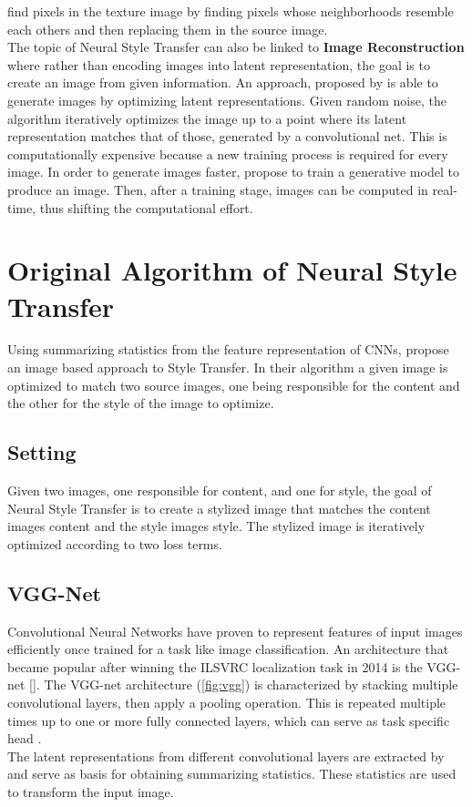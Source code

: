 \documentclass{seminar}
\begin{document}
\cite{efros1999texture} find pixels in the texture image by finding pixels whose neighborhoods resemble each others and then replacing them in the source image.\\
The topic of Neural Style Transfer can also be linked to \textbf{Image Reconstruction} where rather than encoding images into latent representation, the goal is to create an image from given information. An approach, proposed by \cite{mahendran2015understanding} is able to generate images by optimizing latent representations. Given random noise, the algorithm iteratively optimizes the image up to a point where its latent representation matches that of those, generated by a convolutional net.
This is computationally expensive because a new training process is required for every image. In order to generate images faster, \cite{dosovitskiy2016generating} propose to train a generative model to produce an image. Then, after a training stage, images can be computed in real-time, thus shifting the computational effort.




\section{Original Algorithm of Neural Style Transfer}
Using summarizing statistics from the feature representation of CNNs, \cite{gatys2015neural} propose an image based approach to Style Transfer. In their algorithm a given image is optimized to match two source images, one being responsible for the content and the other for the style of the image to optimize.
\subsection{Setting}
Given two images, one responsible for content, and one for style, the goal of Neural Style Transfer is to create a stylized image that matches the content images content and the style images style. The stylized image is iteratively optimized according to two loss terms.

\subsection{VGG-Net}
Convolutional Neural Networks have proven to represent features of input images efficiently once trained for a task like image classification. An architecture that became popular after winning the ILSVRC localization task in 2014 is the VGG-net [\cite{ILSVRC15}]. The VGG-net architecture (\ref{fig:vgg}) is characterized by stacking multiple convolutional layers, then apply a pooling operation. This is repeated multiple times up to one or more fully connected layers, which can serve as task specific head \cite{simonyan2014very}.\\
The latent representations from different convolutional layers are extracted by \cite{gatys2015neural} and serve as basis for obtaining summarizing statistics.
These statistics are used to transform the input image.
\end{document}
